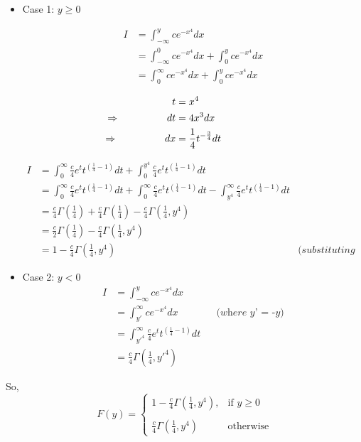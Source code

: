 \documentclass{article}
\theoremstyle{remark}
\begin{document}
\begin{itemize}

\item \large{Case 1: $y\geq 0$}

\begin{align*}
    I &= \int_{-\infty}^{y} c e^{-x^{4}} dx \\
    &= \int_{-\infty}^{0} c e^{-x^{4}} dx + \int_{0}^{y} c e^{-x^{4}} dx \\
    &= \int_{0}^{\infty} c e^{-x^{4}} dx + \int_{0}^{y} c e^{-x^{4}} dx \\
\end{align*}
\begin{align*}
  t&=x^4 \\
  \llap{$\Rightarrow$\hspace{50pt}} dt&=4x^3dx\\
  \llap{$\Rightarrow$\hspace{50pt}} dx &= \frac{1}{4} t^{-\frac{3}{4}} dt
\end{align*}

\begin{align*}
    I &= \int_{0}^{\infty} \frac{c}{4} e^{t} t^{(\frac{1}{4}-1)} dt + \int_{0}^{y^4} \frac{c}{4} e^{t} t^{(\frac{1}{4}-1)} dt\\
     &= \int_{0}^{\infty} \frac{c}{4} e^{t} t^{(\frac{1}{4}-1)} dt+ \int_{0}^{\infty} \frac{c}{4} e^{t} t^{(\frac{1}{4}-1)} dt - \int_{y^4}^{\infty} \frac{c}{4} e^{t} t^{(\frac{1}{4}-1)} dt\\
     &= \frac{c}{4} \Gamma(\frac{1}{4}) + \frac{c}{4} \Gamma(\frac{1}{4}) - \frac{c}{4} \Gamma(\frac{1}{4},y^4)\\
     &= \frac{c}{2}\Gamma(\frac{1}{4}) - \frac{c}{4} \Gamma(\frac{1}{4},y^4) \\
     &= 1 - \frac{c}{4} \Gamma(\frac{1}{4},y^4) &\textit{(substituting c)}
\end{align*}

\item \large{Case 2: $y < 0$}
\begin{align*}
    I &= \int_{-\infty}^{y} c e^{-x^{4}} dx \\
    &= \int_{{y}'}^{\infty} c e^{-x^{4}} dx &&\textit{(where {y}' = -y)}\\
    &= \int_{{y}'^4}^{\infty} \frac{c}{4} e^{t} t^{(\frac{1}{4}-1)} dt \\
    &= \frac{c}{4} \Gamma(\frac{1}{4},{y}'^4)
\end{align*}

\end{itemize}

So,
\[
    F(y)= 
\begin{cases}
    1 - \frac{c}{4} \Gamma(\frac{1}{4},y^4),& \text{if } y\geq 0\\ \\
    \frac{c}{4} \Gamma(\frac{1}{4},y^4)              & \text{otherwise}
\end{cases}
\]
\end{document}
